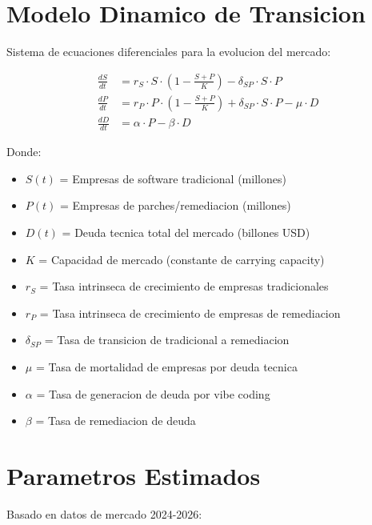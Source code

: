 \documentclass{article}
\begin{document}
\section{Modelo Dinamico de Transicion}

Sistema de ecuaciones diferenciales para la evolucion del mercado:

\begin{align}
\frac{dS}{dt} &= r_S \cdot S \cdot \left(1 - \frac{S + P}{K}\right) - \delta_{SP} \cdot S \cdot P \\
\frac{dP}{dt} &= r_P \cdot P \cdot \left(1 - \frac{S + P}{K}\right) + \delta_{SP} \cdot S \cdot P - \mu \cdot D \\
\frac{dD}{dt} &= \alpha \cdot P - \beta \cdot D
\end{align}

Donde:
\begin{itemize}
    \item $S(t)$ = Empresas de software tradicional (millones)
    \item $P(t)$ = Empresas de parches/remediacion (millones)
    \item $D(t)$ = Deuda tecnica total del mercado (billones USD)
    \item $K$ = Capacidad de mercado (constante de carrying capacity)
    \item $r_S$ = Tasa intrinseca de crecimiento de empresas tradicionales
    \item $r_P$ = Tasa intrinseca de crecimiento de empresas de remediacion
    \item $\delta_{SP}$ = Tasa de transicion de tradicional a remediacion
    \item $\mu$ = Tasa de mortalidad de empresas por deuda tecnica
    \item $\alpha$ = Tasa de generacion de deuda por vibe coding
    \item $\beta$ = Tasa de remediacion de deuda
\end{itemize}

\section{Parametros Estimados}

Basado en datos de mercado 2024-2026:
\end{document}

